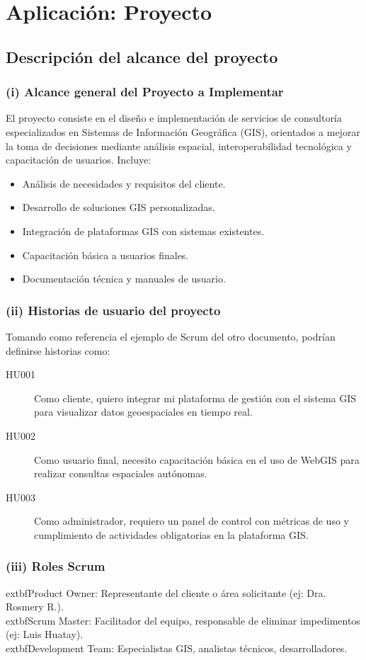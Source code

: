 \section{Aplicación: Proyecto}

\subsection{Descripción del alcance del proyecto}
\subsubsection{(i) Alcance general del Proyecto a Implementar}
El proyecto consiste en el diseño e implementación de servicios de consultoría especializados en Sistemas de Información Geográfica (GIS), orientados a mejorar la toma de decisiones mediante análisis espacial, interoperabilidad tecnológica y capacitación de usuarios. Incluye:
\begin{itemize}
  \item Análisis de necesidades y requisitos del cliente.
  \item Desarrollo de soluciones GIS personalizadas.
  \item Integración de plataformas GIS con sistemas existentes.
  \item Capacitación básica a usuarios finales.
  \item Documentación técnica y manuales de usuario.
\end{itemize}

\subsubsection{(ii) Historias de usuario del proyecto}
Tomando como referencia el ejemplo de Scrum del otro documento, podrían definirse historias como:
\begin{description}
  \item[HU001] Como cliente, quiero integrar mi plataforma de gestión con el sistema GIS para visualizar datos geoespaciales en tiempo real.
  \item[HU002] Como usuario final, necesito capacitación básica en el uso de WebGIS para realizar consultas espaciales autónomas.
  \item[HU003] Como administrador, requiero un panel de control con métricas de uso y cumplimiento de actividades obligatorias en la plataforma GIS.
\end{description}

\subsubsection{(iii) Roles Scrum}
	extbf{Product Owner:} Representante del cliente o área solicitante (ej: Dra. Rosmery R.).\\
	extbf{Scrum Master:} Facilitador del equipo, responsable de eliminar impedimentos (ej: Luis Huatay).\\
	extbf{Development Team:} Especialistas GIS, analistas técnicos, desarrolladores.

